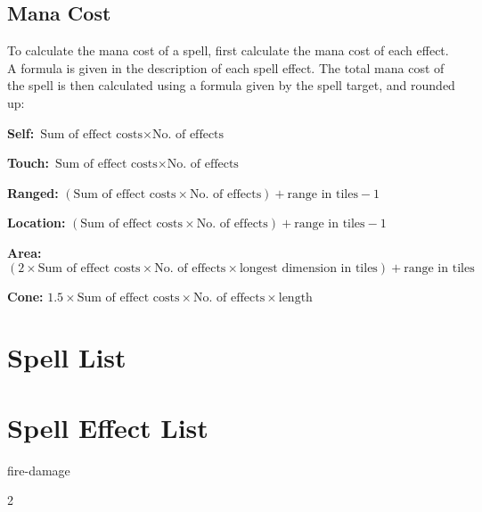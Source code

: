\begin{multicols*}{2}
    \subsection{Mana Cost}
    To calculate the mana cost of a spell, first calculate the mana cost of
    each effect. A formula is given in the description of each spell effect.
    The total mana cost of the spell is then calculated using a formula given
    by the spell target, and rounded up:
    
    \noindent
    \textbf{Self:} $\text{Sum of effect costs} \times \text{No. of effects}$

    \noindent
    \textbf{Touch:} $\text{Sum of effect costs} \times \text{No. of effects}$

    \noindent
    \textbf{Ranged:} $(\text{Sum of effect costs} \times \text{No. of effects}) + \text{range in tiles} - 1$

    \noindent
    \textbf{Location:} $(\text{Sum of effect costs} \times \text{No. of effects}) + \text{range in tiles} - 1$

    \noindent
    \textbf{Area:} $(2 \times \text{Sum of effect costs} \times \text{No. of effects} \times \text{longest dimension in tiles}) + \text{range in tiles}$

    \noindent
    \textbf{Cone:} $1.5 \times \text{Sum of effect costs} \times \text{No. of effects} \times \text{length}$

    \section{Spell List}

    \section{Spell Effect List}
    {fire-damage}

\end{multicols*}{2}
